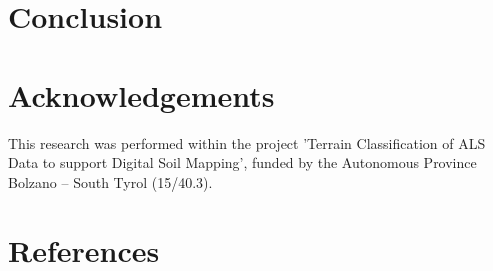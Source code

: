 \documentclass[preprint,12pt,authoryear]{elsarticle}
\begin{document}
\section{Conclusion}
 

\section*{Acknowledgements} This research was performed within the project 'Terrain Classification of ALS Data to support Digital Soil Mapping', funded by the Autonomous Province Bolzano -- South Tyrol (15/40.3).

\section*{References}

\end{document}
